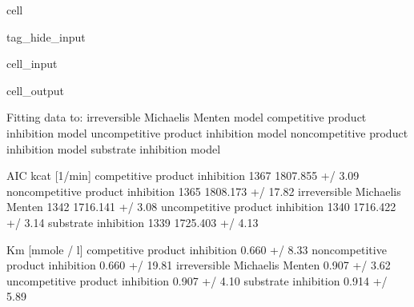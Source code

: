 \documentclass[letterpaper,10pt,english]{jupyterBook}
\begin{document}
\begin{sphinxuseclass}{cell}
\begin{sphinxuseclass}{tag_hide_input}\begin{sphinxVerbatimInput}

\begin{sphinxuseclass}{cell_input}
\begin{sphinxVerbatim}[commandchars=\\\{\}]
    \PYG{p}{[}    \PYG{p}{]}
\end{sphinxVerbatim}

\end{sphinxuseclass}\end{sphinxVerbatimInput}
\begin{sphinxVerbatimOutput}

\begin{sphinxuseclass}{cell_output}
\begin{sphinxVerbatim}[commandchars=\\\{\}]
Fitting data to:
 \PYGZhy{} irreversible Michaelis Menten model
 \PYGZhy{} competitive product inhibition model
 \PYGZhy{} uncompetitive product inhibition model
 \PYGZhy{} non\PYGZhy{}competitive product inhibition model
 \PYGZhy{} substrate inhibition model
\end{sphinxVerbatim}

\begin{sphinxVerbatim}[commandchars=\\\{\}]
                                     AIC         kcat [1/min]  \PYGZbs{}
competitive product inhibition     \PYGZhy{}1367   1807.855 +/\PYGZhy{} 3.09\PYGZpc{}   
non\PYGZhy{}competitive product inhibition \PYGZhy{}1365  1808.173 +/\PYGZhy{} 17.82\PYGZpc{}   
irreversible Michaelis Menten      \PYGZhy{}1342   1716.141 +/\PYGZhy{} 3.08\PYGZpc{}   
uncompetitive product inhibition   \PYGZhy{}1340   1716.422 +/\PYGZhy{} 3.14\PYGZpc{}   
substrate inhibition               \PYGZhy{}1339   1725.403 +/\PYGZhy{} 4.13\PYGZpc{}   

                                      Km [mmole / l]  \PYGZbs{}
competitive product inhibition       0.660 +/\PYGZhy{} 8.33\PYGZpc{}   
non\PYGZhy{}competitive product inhibition  0.660 +/\PYGZhy{} 19.81\PYGZpc{}   
irreversible Michaelis Menten        0.907 +/\PYGZhy{} 3.62\PYGZpc{}   
uncompetitive product inhibition     0.907 +/\PYGZhy{} 4.10\PYGZpc{}   
substrate inhibition                 0.914 +/\PYGZhy{} 5.89\PYGZpc{}   


\end{sphinxVerbatim}
\end{sphinxuseclass}
\end{sphinxVerbatimOutput}
\end{sphinxuseclass}
\end{sphinxuseclass}
\end{document}
